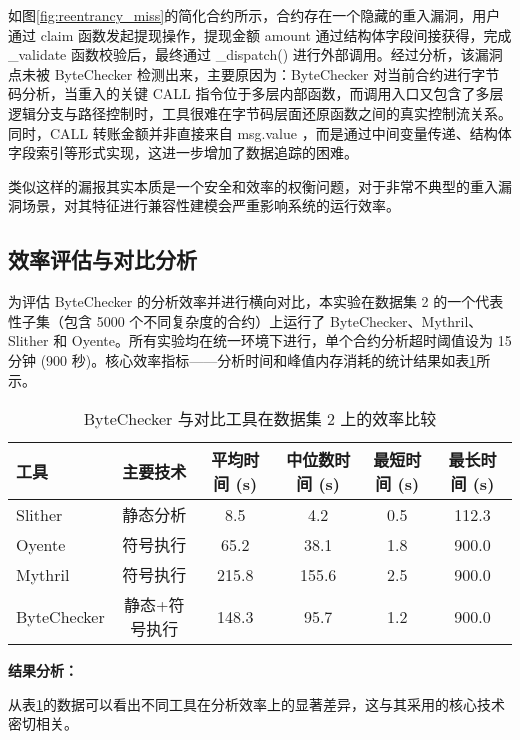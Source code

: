 \documentclass[print, master, vlined, timesmath]{DissertUESTC}
\begin{document}
如图\ref{fig:reentrancy_miss}的简化合约所示，合约存在一个隐藏的重入漏洞，用户通过 claim 函数发起提现操作，提现金额 amount 通过结构体字段间接获得，完成 \_validate 函数校验后，最终通过 \_dispatch() 进行外部调用。经过分析，该漏洞点未被 ByteChecker 检测出来，主要原因为：ByteChecker 对当前合约进行字节码分析，当重入的关键 CALL 指令位于多层内部函数，而调用入口又包含了多层逻辑分支与路径控制时，工具很难在字节码层面还原函数之间的真实控制流关系。同时，CALL 转账金额并非直接来自 msg.value ，而是通过中间变量传递、结构体字段索引等形式实现，这进一步增加了数据追踪的困难。

类似这样的漏报其实本质是一个安全和效率的权衡问题，对于非常不典型的重入漏洞场景，对其特征进行兼容性建模会严重影响系统的运行效率。


\subsection{效率评估与对比分析}

为评估 ByteChecker 的分析效率并进行横向对比，本实验在数据集 2 的一个代表性子集（包含 5000 个不同复杂度的合约）上运行了 ByteChecker、Mythril、Slither 和 Oyente。所有实验均在统一环境下进行，单个合约分析超时阈值设为 15 分钟 (900 秒)。核心效率指标——分析时间和峰值内存消耗的统计结果如表\ref{tab:efficiency_comparison}所示。

\begin{table}[H]
    \centering
    \caption{ByteChecker 与对比工具在数据集 2 上的效率比较}
    \begin{tabularx}{\linewidth}{lccccc}
        \toprule
        \textbf{工具} & \textbf{主要技术} & \textbf{平均时间 (s)} & \textbf{中位数时间 (s)} & \textbf{最短时间 (s)} & \textbf{最长时间 (s)} \\
        \midrule
        Slither & 静态分析 & 8.5 & 4.2 & 0.5 & 112.3 \\
        Oyente & 符号执行  & 65.2 & 38.1 & 1.8 & 900.0  \\
        Mythril & 符号执行 & 215.8 & 155.6 & 2.5 & 900.0 \\
        ByteChecker & 静态+符号执行 & 148.3 & 95.7 & 1.2 & 900.0 \\
        \bottomrule
    \end{tabularx}
    \label{tab:efficiency_comparison}
\end{table}

\textbf{结果分析：}

从表\ref{tab:efficiency_comparison}的数据可以看出不同工具在分析效率上的显著差异，这与其采用的核心技术密切相关。
\end{document}
